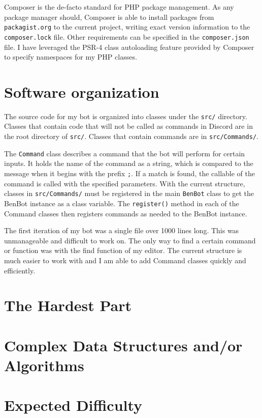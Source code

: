 \documentclass[12pt]{article} %
\begin{document}
Composer is the de-facto standard for PHP package management. As any package manager should, Composer is able to install packages from \verb|packagist.org| to the current project, writing exact version information to the \verb|composer.lock| file. Other requirements can be specified in the \verb|composer.json| file. I have leveraged the PSR-4 class autoloading feature provided by Composer to specify namespaces for my PHP classes.

\section*{Software organization}

The source code for my bot is organized into classes under the \verb|src/| directory. Classes that contain code that will not be called as commands in Discord are in the root directory of \verb|src/|. Classes that contain commands are in \verb|src/Commands/|. 

The \verb|Command| class describes a command that the bot will perform for certain inputs. It holds the name of the command as a string, which is compared to the message when it begins with the prefix \verb|;|. If a match is found, the callable of the command is called with the specified parameters. With the current structure, classes in \verb|src/Commands/| must be registered in the main \verb|BenBot| class to get the BenBot instance as a class variable. The \verb|register()| method in each of the Command classes then registers commands as needed to the BenBot instance.

The first iteration of my bot was a single file over 1000 lines long. This was unmanageable and difficult to work on. The only way to find a certain command or function was with the find function of my editor. The current structure is much easier to work with and I am able to add Command classes quickly and efficiently.

\section*{The Hardest Part}



\section*{Complex Data Structures and/or Algorithms}



\section*{Expected Difficulty}
\end{document}
